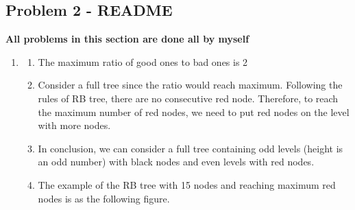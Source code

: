 \documentclass{article}
\begin{document}
\begin{CJK*}{UTF8}{bsmi}
\section{Problem 2 - README}
\textbf{All problems in this section are done all by myself}
\begin{enumerate}
    \item \begin{enumerate}
        \item The maximum ratio of good ones to bad ones is 2
        \item Consider a full tree since the ratio would reach maximum. Following the rules of RB tree, there are no consecutive red node. Therefore, to reach the maximum number of red nodes, we need to put red nodes on the level with more nodes.
        \item In conclusion, we can consider a full tree containing odd levels (height is an odd number) with black nodes and even levels with red nodes. 
        \item The example of the RB tree with 15 nodes and reaching maximum red nodes is as the following figure.
    \end{enumerate}
    

\end{enumerate}
\end{CJK*}
\end{document}

